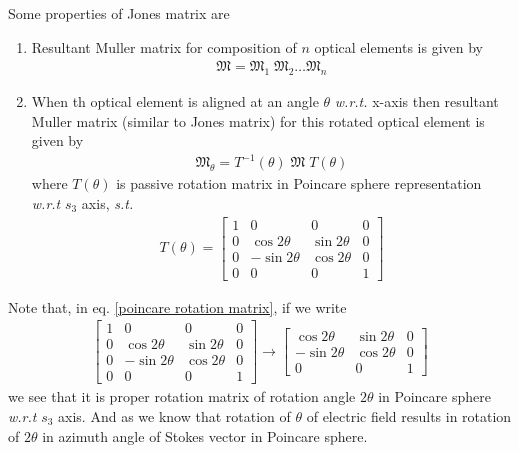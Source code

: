 \documentclass[11pt,a4paper]{article}
\numberwithin{equation}{section}
\begin{document}
Some properties of Jones matrix are 
\begin{enumerate}
	\item Resultant Muller matrix for composition of $n$ optical elements is given by
	\begin{align}
		\boldsymbol{\mathfrak{M}}=\boldsymbol{\mathfrak{M}}_1\;\boldsymbol{\mathfrak{M}}_2 \dots {\boldsymbol{\mathfrak{M}}_n}
	\end{align}
	\item When th optical element is aligned at an angle $\theta$ \textit{w.r.t.} x-axis then resultant Muller matrix (similar to Jones matrix) for this rotated optical element is given by
	\begin{align}
		\boldsymbol{\mathfrak{M}}_\theta = T^{-1}(\theta)\;\boldsymbol{\mathfrak{M}}\;T(\theta)
	\end{align}
	where $T(\theta)$ is passive rotation matrix in Poincare sphere representation \textit{w.r.t} $s_3$ axis, \textit{s.t.}
	\begin{align}
		T(\theta)=
		\begin{bmatrix}
			1 & 0 & 0 & 0\\
			0 & \cos2\theta & \sin2\theta & 0 \\
			0 & -\sin2\theta & \cos2\theta & 0\\
			0 & 0 & 0 & 1
		\end{bmatrix} \label{poincare rotation matrix}
	\end{align}
\end{enumerate}

Note that, in eq. \ref{poincare rotation matrix}, if we write
\begin{align}
	\begin{bmatrix}
		1 & 0 & 0 & 0\\
		0 & \cos2\theta & \sin2\theta & 0 \\
		0 & -\sin2\theta & \cos2\theta & 0\\
		0 & 0 & 0 & 1
	\end{bmatrix} \longrightarrow
	\begin{bmatrix}
		\cos2\theta & \sin2\theta & 0 \\
		-\sin2\theta & \cos2\theta & 0\\
		0 & 0 & 1
	\end{bmatrix}
\end{align}
we see that it is proper rotation matrix of rotation angle $2\theta$ in Poincare sphere \textit{w.r.t} $s_3$ axis. And as we know that rotation of $\theta$ of electric field results in rotation of $2\theta$ in azimuth angle of Stokes vector in Poincare sphere.
\end{document}
